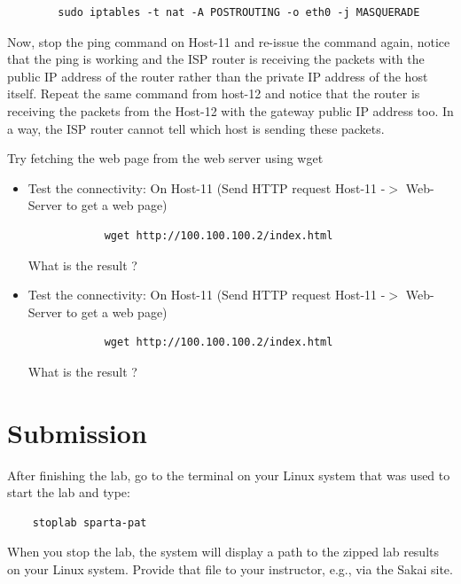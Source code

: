 \begin{verbatim}
		sudo iptables -t nat -A POSTROUTING -o eth0 -j MASQUERADE
\end{verbatim}

Now, stop the ping command on Host-11 and re-issue the command again, notice that the ping is working and the ISP router is receiving the packets with the public IP address of the router rather than the private IP address of the host itself.
\newline
\newline
Repeat the same command from host-12 and notice that the router is receiving the packets from the Host-12 with the gateway public IP address too.
\newline
\newline
In a way, the ISP router cannot tell which host is sending these packets.

Try fetching the web page from the web server using wget
\begin{itemize}
	\item Test the connectivity: On Host-11 (Send HTTP request Host-11 -$>$ Web-Server to get a web page)
	\begin{verbatim}
			wget http://100.100.100.2/index.html
	\end{verbatim}

	What is the result ?

	\item Test the connectivity: On Host-11 (Send HTTP request Host-11 -$>$ Web-Server to get a web page)
	\begin{verbatim}
			wget http://100.100.100.2/index.html
	\end{verbatim}

	What is the result ?
\end{itemize}

\section{Submission}
After finishing the lab, go to the terminal on your Linux system that was used to start the lab and type:
\begin{verbatim}
    stoplab sparta-pat
\end{verbatim}
When you stop the lab, the system will display a path to the zipped lab results on your Linux system.  Provide that file to
your instructor, e.g., via the Sakai site.


